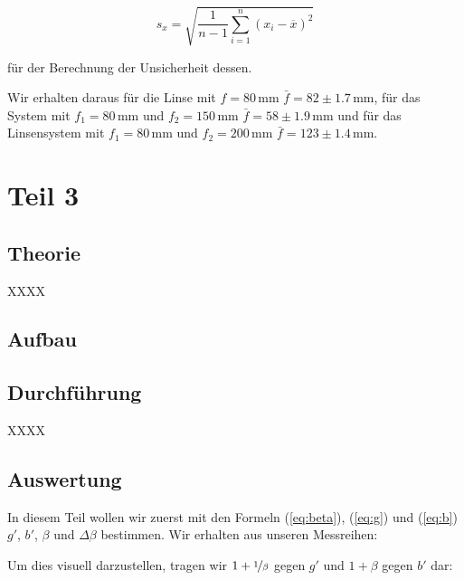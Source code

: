 \documentclass[11pt,a4paper]{article}
\newcommand{\halftime}[4]{\begin{figure}[h]
\begin{minipage}{.#1\textwidth}#3\end{minipage}\begin{minipage}{.#2\textwidth}
\centering
#4\end{minipage}
\end{figure}}
\newcommand\meanstd{\begin{equation}
s_x=\sqrt{\frac{1}{n-1}\sum_{i=1}^n(x_i-\overline{x})^2}\label{meanstd}
\end{equation}}
\begin{document}
\meanstd

f\"ur der Berechnung der Unsicherheit dessen.

Wir erhalten daraus f\"ur die Linse mit $f=80\,$mm $\bar{f}=82\pm1.7\,$mm, f\"ur das System mit $f_1=80\,$mm und $f_2=150\,$mm $\bar{f}=58\pm1.9\,$mm und f\"ur das Linsensystem mit $f_1=80\,$mm und $f_2=200\,$mm $\bar{f}=123\pm1.4\,$mm.

\section{Teil 3}

\subsection{Theorie}

XXXX

\subsection{Aufbau}



\subsection{Durchführung}

XXXX

\subsection{Auswertung}

In diesem Teil wollen wir zuerst mit den Formeln (\ref{eq:beta}), (\ref{eq:g}) und (\ref{eq:b}) $g'$, $b'$, $\beta$ und $\Delta \beta$ bestimmen. Wir erhalten aus unseren Messreihen:

Um dies visuell darzustellen, tragen wir $1+\nicefrac{1}{\beta}$ gegen $g'$ und $1+\beta$ gegen $b'$ dar:
\end{document}
